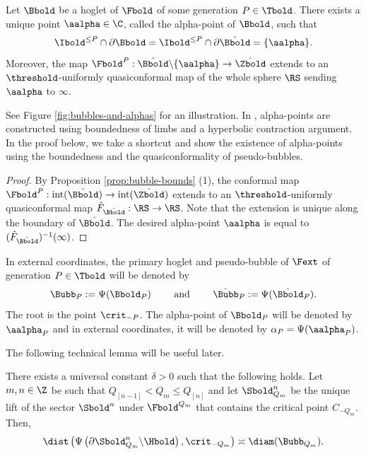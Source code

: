 \documentclass{amsart}
\begin{document}
\begin{corollary}
\label{cor:alpha-points}
    Let $\Bbold$ be a hoglet of $\Fbold$ of some generation $P \in \Tbold$.
    There exists a unique point $\aalpha \in \C$, called the alpha-point of $\Bbold$, such that 
        \[
            \Ibold^{\leq P} \cap \partial \Bbold = \Ibold^{\leq P} \cap \partial \hat{\Bbold} = \{ \aalpha\}.
        \]
    Moreover, the map $\Fbold^P: \hat{\Bbold} \backslash \{\aalpha\} \to \hat{\Zbold}$ extends to an $\threshold$-uniformly quasiconformal map of the whole sphere $\RS$ sending $\aalpha$ to $\infty$.
\end{corollary}

See Figure \ref{fig:bubbles-and-alphas} for an illustration.
In \cite{DLy23}, alpha-points are constructed using boundedness of limbs and a hyperbolic contraction argument.
In the proof below, we take a shortcut and show the existence of alpha-points using the boundedness and the quasiconformality of pseudo-bubbles.

\begin{proof}
    By Proposition \ref{prop:bubble-bounds} (1), the conformal map $\Fbold^P: \textnormal{int}(\hat{\Bbold}) \to \textnormal{int}(\hat{\Zbold})$ extends to an $\threshold$-uniformly quasiconformal map $\hat{F}_{\hat{\Bbold}} : \RS \to \RS$.
    Note that the extension is unique along the boundary of $\hat{\Bbold}$.
    The desired alpha-point $\aalpha$ is equal to $(\hat{F}_{\hat{\Bbold}})^{-1}(\infty)$.
\end{proof}

In external coordinates, the primary hoglet and pseudo-bubble of $\Fext$ of generation $P \in \Tbold$ will be denoted by
\[
    \Bubb_P := \Psi(\Bbold_P) \qquad \text{ and } \qquad \hat{\Bubb}_P := \Psi(\hat{\Bbold}_P).
\]
The root is the point $\crit_{-P}$.
The alpha-point of $\Bbold_P$ will be denoted by $\aalpha_P$ and in external coordinates, it will be denoted by $\alpha_P = \Psi(\aalpha_P)$.

The following technical lemma will be useful later.

\begin{lemma}
\label{lem:estimate-lift-sector}
    There exists a universal constant $\delta>0$ such that the following holds.
    Let $m, n \in \Z$ be such that $Q_{[n-1]} < Q_m \leq Q_{[n]}$ and let
    $\Sbold_{Q_m}^{n}$ be the unique lift of the sector $\Sbold^{n}$ under $\Fbold^{Q_m}$ that contains the critical point $C_{-Q_m}$.
    Then,
    \[
        \dist \left( \Psi \left( \partial \Sbold^n_{Q_m} \backslash \Hbold \right), \crit_{-Q_m} \right) \asymp \diam(\Bubb_{Q_m}).
    \]
\end{lemma}
\end{document}
